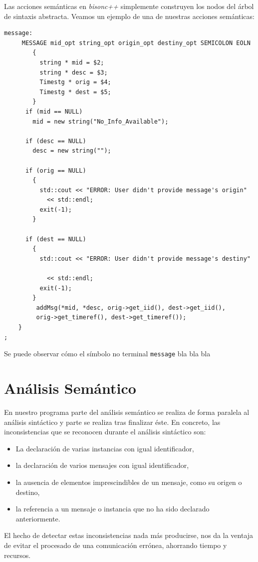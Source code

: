 \documentclass[12pt,a4paper]{report}
\newcommand{\lstsetc}{
  \lstset{
    language=C++,
    style=code,
    literate=,
  }
}
\begin{document}
Las acciones semánticas en \emph{bisonc++} simplemente construyen los
nodos del árbol de sintaxis abstracta. Veamos un ejemplo de una de nuestras acciones semánticas:
\lstsetc
\begin{lstlisting}
message:
     MESSAGE mid_opt string_opt origin_opt destiny_opt SEMICOLON EOLN
        { 
	      string * mid = $2;
          string * desc = $3;
          Timestg * orig = $4;
          Timestg * dest = $5;
        }
	  if (mid == NULL)
	    mid = new string("No_Info_Available");

	  if (desc == NULL)
	    desc = new string("");

	  if (orig == NULL)
	    {
	      std::cout << "ERROR: User didn't provide message's origin" 
			<< std::endl;
	      exit(-1);
	    }

	  if (dest == NULL)
	    {
	      std::cout << "ERROR: User didn't provide message's destiny" 

			<< std::endl;
	      exit(-1);
	    }
	     addMsg(*mid, *desc, orig->get_iid(), dest->get_iid(), 
		 orig->get_timeref(), dest->get_timeref());
	}
;
\end{lstlisting}

Se puede observar cómo el símbolo no terminal \lstinline{message} bla bla bla

\section{Análisis Semántico}

En nuestro programa parte del análisis semántico se realiza de forma paralela al análisis sintáctico y parte se realiza tras finalizar éste. En concreto, las inconsistencias que se reconocen durante el análisis sintáctico son:
\begin{itemize}
\item La declaración de varias instancias con igual identificador,
\item la declaración de varios mensajes con igual identificador,
\item la ausencia de elementos imprescindibles de un mensaje, como su origen o destino,
\item la referencia a un mensaje o instancia que no ha sido declarado anteriormente.
\end{itemize}

El hecho de detectar estas inconsistencias nada más producirse, nos da la ventaja de evitar el procesado de una comunicación errónea, ahorrando tiempo y recursos.
\end{document}
